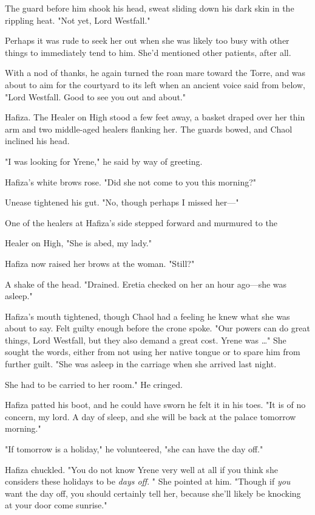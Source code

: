 The guard before him shook his head, sweat sliding down his dark skin in the rippling heat. "Not yet, Lord Westfall."

Perhaps it was rude to seek her out when she was likely too busy with other things to immediately tend to him. She'd mentioned other patients, after all.

With a nod of thanks, he again turned the roan mare toward the Torre, and was about to aim for the courtyard to its left when an ancient voice said from below, "Lord Westfall. Good to see you out and about."

Hafiza. The Healer on High stood a few feet away, a basket draped over her thin arm and two middle-aged healers flanking her. The guards bowed, and Chaol inclined his head.

"I was looking for Yrene," he said by way of greeting.

Hafiza's white brows rose. "Did she not come to you this morning?"

Unease tightened his gut. "No, though perhaps I missed her---"

One of the healers at Hafiza's side stepped forward and murmured to the

Healer on High, "She is abed, my lady."

Hafiza now raised her brows at the woman. "Still?"

A shake of the head. "Drained. Eretia checked on her an hour ago---she was asleep."

Hafiza's mouth tightened, though Chaol had a feeling he knew what she was about to say. Felt guilty enough before the crone spoke. "Our powers can do great things, Lord Westfall, but they also demand a great cost. Yrene was \ldots" She sought the words, either from not using her native tongue or to spare him from further guilt. "She was asleep in the carriage when she arrived last night.

She had to be carried to her room." He cringed.

Hafiza patted his boot, and he could have sworn he felt it in his toes. "It is of no concern, my lord. A day of sleep, and she will be back at the palace tomorrow morning."

"If tomorrow is a holiday," he volunteered, "she can have the day off."

Hafiza chuckled. "You do not know Yrene very well at all if you think she considers these holidays to be \emph{days off}. " She pointed at him. "Though if \emph{you} want the day off, you should certainly tell her, because she'll likely be knocking at your door come sunrise."

